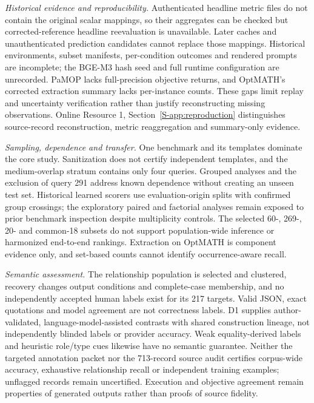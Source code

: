 \documentclass[pdflatex,iicol,sn-basic,Numbered]{sn-jnl}
\begin{document}
\emph{Historical evidence and reproducibility.} Authenticated headline metric files do not contain the original scalar mappings, so their aggregates can be checked but corrected-reference headline reevaluation is unavailable. Later caches and unauthenticated prediction candidates cannot replace those mappings. Historical environments, subset manifests, per-condition outcomes and rendered prompts are incomplete; the BGE-M3 hash seed and full runtime configuration are unrecorded. PaMOP lacks full-precision objective returns, and OptMATH's corrected extraction summary lacks per-instance counts. These gaps limit replay and uncertainty verification rather than justify reconstructing missing observations. Online Resource 1, Section~\ref{S-app:reproduction} distinguishes source-record reconstruction, metric reaggregation and summary-only evidence.

\emph{Sampling, dependence and transfer.} One benchmark and its templates dominate the core study. Sanitization does not certify independent templates, and the medium-overlap stratum contains only four queries. Grouped analyses and the exclusion of query 291 address known dependence without creating an unseen test set. Historical learned scorers use evaluation-origin splits with confirmed group crossings; the exploratory paired and factorial analyses remain exposed to prior benchmark inspection despite multiplicity controls. The selected 60-, 269-, 20- and common-18 subsets do not support population-wide inference or harmonized end-to-end rankings. Extraction on OptMATH is component evidence only, and set-based counts cannot identify occurrence-aware recall.

\emph{Semantic assessment.} The relationship population is selected and clustered, recovery changes output conditions and complete-case membership, and no independently accepted human labels exist for its 217 targets. Valid JSON, exact quotations and model agreement are not correctness labels. D1 supplies author-validated, language-model-assisted contrasts with shared construction lineage, not independently blinded labels or provider accuracy. Weak equality-derived labels and heuristic role/type cues likewise have no semantic guarantee. Neither the targeted annotation packet nor the 713-record source audit certifies corpus-wide accuracy, exhaustive relationship recall or independent training examples; unflagged records remain uncertified. Execution and objective agreement remain properties of generated outputs rather than proofs of source fidelity.
\end{document}

